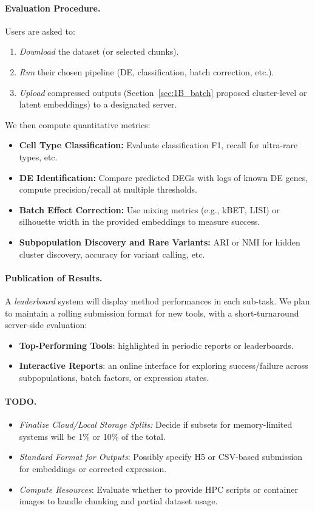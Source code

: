 \documentclass{article}
\begin{document}
\paragraph{Evaluation Procedure.}
Users are asked to:
\begin{enumerate}
	\item \emph{Download} the dataset (or selected chunks).
	\item \emph{Run} their chosen pipeline (DE, classification, batch correction, etc.).
	\item \emph{Upload} compressed outputs (Section~\ref{sec:1B_batch} proposed cluster-level or latent embeddings) to a designated server.
\end{enumerate}
We then compute quantitative metrics:
\begin{itemize}
	\item \textbf{Cell Type Classification:} Evaluate classification F1, recall for ultra-rare types, etc.
	\item \textbf{DE Identification:} Compare predicted DEGs with logs of known DE genes, compute precision/recall at multiple thresholds.
	\item \textbf{Batch Effect Correction:} Use mixing metrics (e.g., kBET, LISI) or silhouette width in the provided embeddings to measure success.
	\item \textbf{Subpopulation Discovery and Rare Variants:} ARI or NMI for hidden cluster discovery, accuracy for variant calling, etc.
\end{itemize}

\paragraph{Publication of Results.}
A \emph{leaderboard} system will display method performances in each sub-task. We plan to maintain a rolling submission format for new tools, with a short-turnaround server-side evaluation:
\begin{itemize}
	\item \textbf{Top-Performing Tools}: highlighted in periodic reports or leaderboards.
	\item \textbf{Interactive Reports}: an online interface for exploring success/failure across subpopulations, batch factors, or expression states.
\end{itemize}

\paragraph{TODO.}
\begin{itemize}
	\item \emph{Finalize Cloud/Local Storage Splits:} Decide if subsets for memory-limited systems will be 1\% or 10\% of the total.
	\item \emph{Standard Format for Outputs}: Possibly specify H5 or CSV-based submission for embeddings or corrected expression.
	\item \emph{Compute Resources}: Evaluate whether to provide HPC scripts or container images to handle chunking and partial dataset usage.
\end{itemize}
\end{document}
